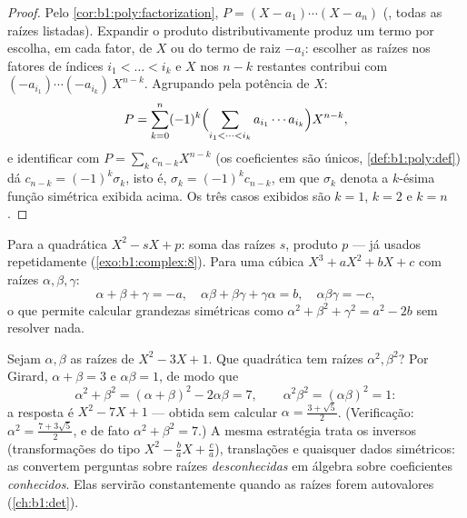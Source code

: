 \begin{proof}
Pelo \cref{cor:b1:poly:factorization}, $P = (X - a_1)\cdots(X -
a_n)$ (, todas as raízes listadas). Expandir o produto
distributivamente produz um termo por escolha, em cada
fator, de $X$ ou do termo de raiz $-a_i$: escolher as raízes nos
fatores de índices $i_1 < \dots < i_k$ e $X$ nos $n - k$
restantes contribui com $(-a_{i_1})\cdots(-a_{i_k})\,X^{n-k}$. Agrupando
pela potência de $X$:
\[
P = \sum_{k=0}^{n} (-1)^k
\Bigl(\sum_{i_1 < \dots < i_k} a_{i_1}\cdots a_{i_k}\Bigr)
X^{n-k} ,
\]
e identificar com $P = \sum_k c_{n-k}X^{n-k}$ (os coeficientes
são únicos, \cref{def:b1:poly:def}) dá $c_{n-k} = (-1)^k
\sigma_k$, isto é, $\sigma_k = (-1)^kc_{n-k}$, em que $\sigma_k$
denota a $k$-ésima função simétrica exibida acima. Os três
casos exibidos são $k = 1$, $k = 2$ e $k = n$.
\end{proof}

\begin{example}\label{ex:b1:poly:vieta}
Para a quadrática $X^2 - sX + p$: soma das raízes $s$, produto $p$ ---
já usados repetidamente (\cref{exo:b1:complex:8}). Para uma cúbica 
$X^3 + aX^2 + bX + c$ com raízes $\alpha, \beta, \gamma$:
\[
\alpha + \beta + \gamma = -a,
\quad
\alpha\beta + \beta\gamma + \gamma\alpha = b,
\quad
\alpha\beta\gamma = -c ,
\]
o que permite calcular grandezas simétricas como $\alpha^2 + \beta^2
+ \gamma^2 = a^2 - 2b$ sem resolver nada.
\end{example}

\begin{example}\label{ex:b1:poly:transformroots}
Sejam $\alpha, \beta$ as raízes de $X^2 - 3X + 1$. Que quadrática 
tem raízes $\alpha^2, \beta^2$? Por Girard, $\alpha +
\beta = 3$ e $\alpha\beta = 1$, de modo que
\[
\alpha^2 + \beta^2 = (\alpha+\beta)^2 - 2\alpha\beta = 7,
\qquad
\alpha^2\beta^2 = (\alpha\beta)^2 = 1 :
\]
a resposta é $X^2 - 7X + 1$ --- obtida sem calcular
$\alpha = \frac{3 + \sqrt5}2$. (Verificação: $\alpha^2 = \frac{7 +
3\sqrt5}2$, e de fato $\alpha^2 + \beta^2 = 7$.) A mesma
estratégia trata os inversos (transformações do tipo $X^2 - \frac ba X + \frac
ca$), translações e quaisquer dados simétricos: as  convertem perguntas sobre raízes \emph{desconhecidas} em álgebra
sobre coeficientes \emph{conhecidos}. Elas servirão constantemente
quando as raízes forem autovalores (\cref{ch:b1:det}).
\end{example}

